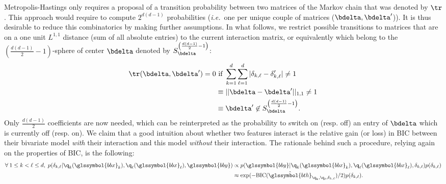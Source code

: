 Metropolis-Hastings only requires a proposal of a transition probability between two matrices of the Markov chain that was denoted by $\tr$. This approach would require to compute $2^{d(d-1)}$ probabilities (\textit{i.e.}\ one per unique couple of matrices ($\bdelta,\bdelta'$)). It is thus desirable to reduce this combinatorics by making further assumptions. In what follows, we restrict possible transitions to matrices that are on a one unit $L^{1,1}$ distance (sum of all absolute entries) to the current interaction matrix, or equivalently which belong to the $\left( \frac{d(d-1)}{2}-1 \right)$-sphere of center $\bdelta$ denoted by $S^{\left( \frac{d(d-1)}{2}-1 \right)}_{\bdelta}$: 
\begin{align*}
\tr(\bdelta,\bdelta') = 0 & \text{ if } \sum_{k=1}^d \sum_{\ell=1}^d |\delta_{k,\ell} - \delta'_{k,\ell}| \neq 1 \\
 & \equiv ||\bdelta - \bdelta'||_{1,1} \neq 1 \\
 & \equiv \bdelta' \not\in S^{\left( \frac{d(d-1)}{2}-1 \right)}_{\bdelta}.
\end{align*}
Only $\frac{d(d-1)}{2}$ coefficients are now needed, which can be reinterpreted as the probability to switch on (resp. off) an entry of $\bdelta$ which is currently off (resp. on). We claim that a good intuition about whether two features interact is the relative gain (or loss) in BIC between their bivariate model \textit{with} their interaction and this model \textit{without} their interaction. The rationale behind such a procedure, relying again on the properties of BIC, is the following: 
\begin{align*}
\forall \: 1 \leq k < \ell \leq d, \; p(\delta_{k,\ell} | \q_k(\glssymbol{bbx}_k), \q_\ell(\glssymbol{bbx}_\ell), \glssymbol{bby}) & \propto p(\glssymbol{bby} | \q_k(\glssymbol{bbx}_k), \q_\ell(\glssymbol{bbx}_\ell), \delta_{k,\ell}) p(\delta_{k,\ell}) \\
& \approx \exp(-\text{BIC}(\hat{\glssymbol{bth}}_{\q_k,\q_\ell,\delta_{k,\ell}})/2) p(\delta_{k,\ell}).
\end{align*}

